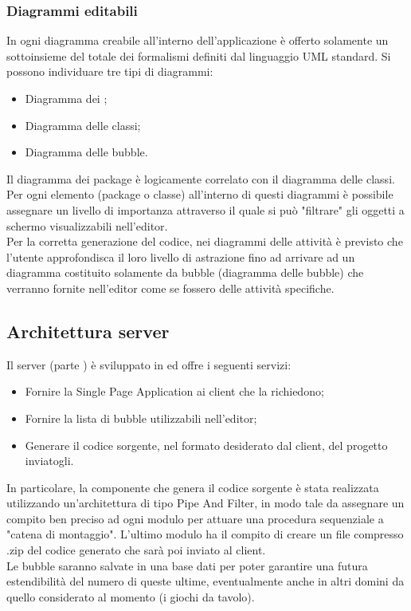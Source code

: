 \documentclass[../DefinizioneDiProdotto.tex]{subfiles}
\begin{document}
				\subsubsection{Diagrammi editabili}
					In ogni diagramma creabile all'interno dell'applicazione è offerto solamente un
					sottoinsieme del totale dei formalismi definiti dal linguaggio UML standard.
					Si possono individuare tre tipi di diagrammi:
					\begin{itemize}
						\item Diagramma dei ;
						\item Diagramma delle classi;
						\item Diagramma delle bubble.
					\end{itemize}
					Il diagramma dei package è logicamente correlato con il diagramma delle classi. Per ogni
					elemento (package o classe) all'interno di questi diagrammi è possibile assegnare un
					livello di importanza attraverso il quale si può "filtrare" gli oggetti a schermo
					visualizzabili nell'editor.\\
					Per la corretta generazione del codice, nei diagrammi delle attività è previsto che
					l'utente approfondisca il loro livello di astrazione fino ad arrivare ad un diagramma
					costituito solamente da bubble (diagramma delle bubble) che verranno fornite nell'editor
					come se fossero delle attività specifiche.
			\subsection{Architettura server}
				Il server (parte ) è sviluppato in  ed offre i seguenti servizi:
				\begin{itemize}
					\item Fornire la Single Page Application ai client che la richiedono;
					\item Fornire la lista di bubble utilizzabili nell'editor;
					\item Generare il codice sorgente, nel formato desiderato dal client, del progetto
					inviatogli.
				\end{itemize}
				In particolare, la componente che genera il codice sorgente è stata realizzata utilizzando
				un'architettura di tipo Pipe And Filter, in modo tale da assegnare un compito ben preciso
				ad ogni modulo per attuare una procedura sequenziale a "catena di montaggio". L'ultimo
				modulo ha il compito di creare un file compresso .zip del codice generato che sarà poi
				inviato al client.\\
				Le bubble saranno salvate in una base dati per poter garantire una futura estendibilità del
				numero di queste ultime, eventualmente anche in altri domini da quello considerato al
				momento (i giochi da tavolo).
\end{document}
